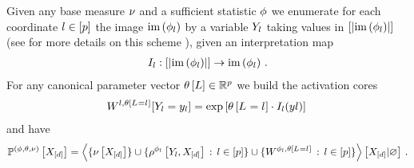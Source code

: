 \begin{theorem}
    \label{the:expFamilyTensorRep}
    Given any base measure $\nu$ and a sufficient statistic $\phi$ we enumerate for each coordinate $l\in[p]$ the image $\mathrm{im}\left(\phi_{l}\right)$ by a variable $Y_{l}$ taking values in $[\left|\mathrm{im}\left(\phi_{l}\right)\right|]$ (see for more details on this scheme ), given an interpretation map
    \begin{align*}
        I_{l} :
        [\left|\mathrm{im}\left(\phi_{l}\right)\right|] \rightarrow \mathrm{im}\left(\phi_{l}\right) \, .
    \end{align*}
    For any canonical parameter vector $\theta\left[L\right]\in\mathbb{R}^{p}$ we build the activation cores
    \begin{align*}
        W^{l,\theta\left[L_{}=l_{}\right]}[Y_{l}=y_{l}]
        = \mathrm{exp}\left[\theta\left[L_{}=l_{}\right] \cdot I_{l}(y{l}) \right] \,
    \end{align*}
    and have
    \begin{align*}
        \mathbb{P}^{(\phi,\theta,\nu)}\left[X_{[d]}\right] =
        \left\langle \{\nu\left[X_{[d]}\right]\} \cup \{\rho^{\phi_{l}}\left[Y_{l},X_{[d]}\right] \, : \, l\in[p]\}\cup\{W^{\phi_{l},\theta\left[L_{}=l_{}\right]} \, : \, l\in[p]\}\right\rangle \left[ X_{[d]} | \varnothing \right] \, .
    \end{align*}
\end{theorem}
